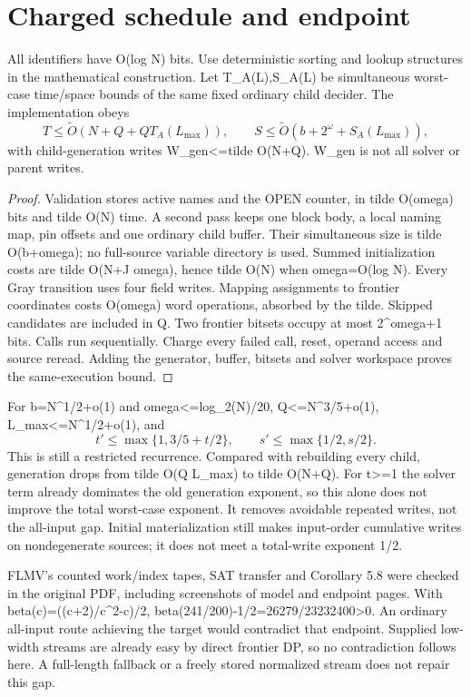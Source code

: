 \documentclass[11pt]{article}
\begin{document}
\section{Charged schedule and endpoint}
All identifiers have O(log N) bits. Use deterministic sorting and lookup structures in the mathematical construction. Let T_A(L),S_A(L) be simultaneous worst-case time/space bounds of the same fixed ordinary child decider. The implementation obeys
\[
T\le\widetilde O(N+Q+Q T_A(L_{\max})),\qquad
S\le\widetilde O(b+2^\omega+S_A(L_{\max})),
\tag{2}
\]
with child-generation writes W_gen<=tilde O(N+Q). W_gen is not all solver or parent writes.

\begin{proof}
Validation stores active names and the OPEN counter, in tilde O(omega) bits and tilde O(N) time. A second pass keeps one block body, a local naming map, pin offsets and one ordinary child buffer. Their simultaneous size is tilde O(b+omega); no full-source variable directory is used. Summed initialization costs are tilde O(N+J omega), hence tilde O(N) when omega=O(log N). Every Gray transition uses four field writes. Mapping assignments to frontier coordinates costs O(omega) word operations, absorbed by the tilde. Skipped candidates are included in Q. Two frontier bitsets occupy at most 2^{omega+1} bits. Calls run sequentially. Charge every failed call, reset, operand access and source reread. Adding the generator, buffer, bitsets and solver workspace proves the same-execution bound.
\end{proof}
For b=N^{1/2+o(1)} and omega<=log_2(N)/20, Q<=N^{3/5+o(1)}, L_max<=N^{1/2+o(1)}, and
\[
t'\le\max\{1,3/5+t/2\},\qquad s'\le\max\{1/2,s/2\}.
\tag{3}
\]
This is still a restricted recurrence. Compared with rebuilding every child, generation drops from tilde O(Q L_max) to tilde O(N+Q). For t>=1 the solver term already dominates the old generation exponent, so this alone does not improve the total worst-case exponent. It removes avoidable repeated writes, not the all-input gap. Initial materialization still makes input-order cumulative writes on nondegenerate sources; it does not meet a total-write exponent 1/2.

FLMV's counted work/index tapes, SAT transfer and Corollary 5.8 were checked in the original PDF, including screenshots of model and endpoint pages. With beta(c)=((c+2)/c^2-c)/2, beta(241/200)-1/2=26279/23232400>0. An ordinary all-input route achieving the target would contradict that endpoint. Supplied low-width streams are already easy by direct frontier DP, so no contradiction follows here. A full-length fallback or a freely stored normalized stream does not repair this gap.
\end{document}
